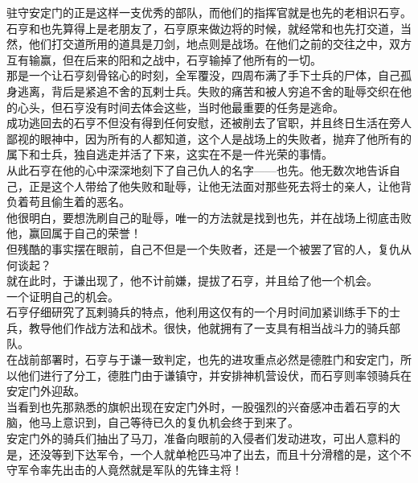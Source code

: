 \begin{multicols}{\theparacolNo}
驻守安定门的正是这样一支优秀的部队，而他们的指挥官就是也先的老相识石亨。\\

石亨和也先算得上是老朋友了，石亨原来做边将的时候，就经常和也先打交道，当然，他们打交道所用的道具是刀剑，地点则是战场。在他们之前的交往之中，双方互有输赢，但在后来的阳和之战中，石亨输掉了他所有的一切。\\

那是一个让石亨刻骨铭心的时刻，全军覆没，四周布满了手下士兵的尸体，自己孤身逃离，背后是紧追不舍的瓦剌士兵。失败的痛苦和被人穷追不舍的耻辱交织在他的心头，但石亨没有时间去体会这些，当时他最重要的任务是逃命。\\

成功逃回去的石亨不但没有得到任何安慰，还被削去了官职，并且终日生活在旁人鄙视的眼神中，因为所有的人都知道，这个人是战场上的失败者，抛弃了他所有的属下和士兵，独自逃走并活了下来，这实在不是一件光荣的事情。\\

从此石亨在他的心中深深地刻下了自己仇人的名字——也先。他无数次地告诉自己，正是这个人带给了他失败和耻辱，让他无法面对那些死去将士的亲人，让他背负着苟且偷生着的恶名。\\

他很明白，要想洗刷自己的耻辱，唯一的方法就是找到也先，并在战场上彻底击败他，赢回属于自己的荣誉！\\

但残酷的事实摆在眼前，自己不但是一个失败者，还是一个被罢了官的人，复仇从何谈起？\\

就在此时，于谦出现了，他不计前嫌，提拔了石亨，并且给了他一个机会。\\

一个证明自己的机会。\\

石亨仔细研究了瓦剌骑兵的特点，他利用这仅有的一个月时间加紧训练手下的士兵，教导他们作战方法和战术。很快，他就拥有了一支具有相当战斗力的骑兵部队。\\

在战前部署时，石亨与于谦一致判定，也先的进攻重点必然是德胜门和安定门，所以他们进行了分工，德胜门由于谦镇守，并安排神机营设伏，而石亨则率领骑兵在安定门外迎敌。\\

当看到也先那熟悉的旗帜出现在安定门外时，一股强烈的兴奋感冲击着石亨的大脑，他马上意识到，自己等待已久的复仇机会终于到来了。\\

安定门外的骑兵们抽出了马刀，准备向眼前的入侵者们发动进攻，可出人意料的是，还没等到下达军令，一个人就单枪匹马冲了出去，而且十分滑稽的是，这个不守军令率先出击的人竟然就是军队的先锋主将！\\


\end{multicols}
